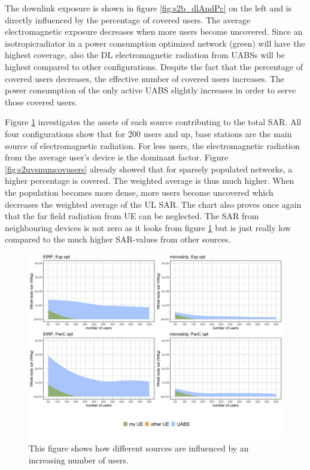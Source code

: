 The downlink exposure is shown in figure \ref{fig:s2b_dlAndPc} on the left and is directly influenced by the percentage of covered users. 
The average electromagnetic exposure decreases when more users become uncovered. Since an \gls{isotropicradiator} in a power consumption optimized network (green)
will have the highest coverage, also the \gls{DL} electromagnetic radiation from \gls{UABS}s will be highest compared to other configurations.
Despite the fact that the percentage of covered users decreases, the effective number of covered users increases. The power consumption of the only 
active \gls{UABS} slightly increases in order to serve those covered users.


Figure \ref{fig:s2fourSourcesMatrix} investigates the assets of each source contributing to the total \gls{SAR}. All four 
configurations show that for 200 users and up, base stations are the main source of electromagnetic radiation.
For less users, the electromagnetic radiation from the average user's device is the dominant factor. Figure \ref{fig:s2uvsnumcovusers} already 
showed that for sparsely populated networks, a higher percentage is covered. The weighted average is thus much higher. When the population becomes more dense,
more users become uncovered which decreases the weighted average of the \gls{UL} \gls{SAR}.
The chart also proves once again that the far field radiation from \gls{UE} can be neglected. The \gls{SAR} from 
neighbouring devices is not zero as it looks from figure \ref{fig:s2fourSourcesMatrix} but is just really low compared to the much higher
\gls{SAR}-values from other sources.

\begin{figure}[h!]
\centering
  \includegraphics[width=\textwidth/6*5]{../results/s2/uFourSources.png}
  \caption{This figure shows how different sources are influenced by an increasing number of users. }
  \label{fig:s2fourSourcesMatrix}
\end{figure}

